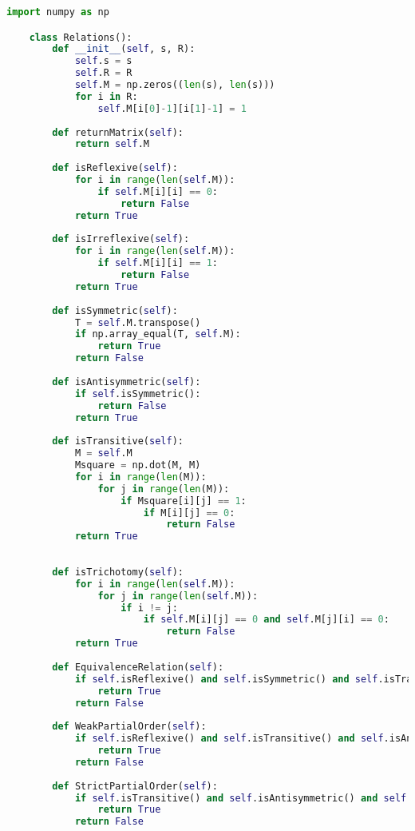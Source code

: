 \begin{lstlisting}[language=Python]
    import numpy as np

    class Relations():
        def __init__(self, s, R):
            self.s = s
            self.R = R
            self.M = np.zeros((len(s), len(s)))
            for i in R:
                self.M[i[0]-1][i[1]-1] = 1
    
        def returnMatrix(self):
            return self.M
    
        def isReflexive(self):
            for i in range(len(self.M)):
                if self.M[i][i] == 0:
                    return False
            return True
    
        def isIrreflexive(self):
            for i in range(len(self.M)):
                if self.M[i][i] == 1:
                    return False
            return True
    
        def isSymmetric(self):
            T = self.M.transpose()
            if np.array_equal(T, self.M):
                return True
            return False
    
        def isAntisymmetric(self):
            if self.isSymmetric():
                return False
            return True
    
        def isTransitive(self):
            M = self.M
            Msquare = np.dot(M, M)            
            for i in range(len(M)):
                for j in range(len(M)):
                    if Msquare[i][j] == 1:
                        if M[i][j] == 0:
                            return False
            return True
    
            
        def isTrichotomy(self):            
            for i in range(len(self.M)):
                for j in range(len(self.M)):
                    if i != j:
                        if self.M[i][j] == 0 and self.M[j][i] == 0:
                            return False
            return True
                        
        def EquivalenceRelation(self):
            if self.isReflexive() and self.isSymmetric() and self.isTransitive():
                return True
            return False
    
        def WeakPartialOrder(self):
            if self.isReflexive() and self.isTransitive() and self.isAntisymmetric():
                return True
            return False
    
        def StrictPartialOrder(self):
            if self.isTransitive() and self.isAntisymmetric() and self.isIrreflexive():
                return True
            return False
    

\end{lstlisting}
